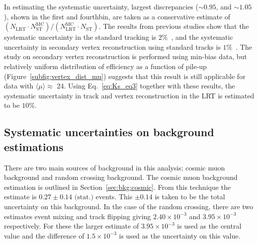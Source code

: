 In estimating the systematic uncertainty, largest discrepancies ($\sim0.95$, and $\sim1.05$), shown in the first and fourthbin, are taken as a conservative estimate of $(N_{\mathrm{LRT}} \cdot N_{\mathrm{ST}}^{\mathrm{MC}}) / (N_{\mathrm{LRT}}^{\mathrm{MC}} \cdot N_{\mathrm{ST}})$. The results from previous studies show that the systematic uncertainty in the standard tracking is $2\%$~\cite{ATL-PHYS-PUB-2015-051}, and the systematic uncertainty in secondary vertex reconstruction using standard tracks is $1\%$~\cite{Aaboud:2215485}. The study on secondary vertex reconstruction is performed using min-bias data, but relatively uniform distribution of efficiency as a function of pile-up (Figure~\ref{subfig:vertex_dist_mu}) suggests that this result is still applicable for data with $\langle \mu \rangle\approx$ 24. Using Eq.~\ref{eq:Ks_eq3} together with these results, the systematic uncertainty in track and vertex reconstruction in the LRT is estimated to be $10\%$.


%
%
%

\subsection{Systematic uncertainties on background estimations}
\label{sec:syst_bkg}

There are two main sources of background in this analysis; cosmic muon background and random crossing background. The cosmic muon background estimation is outlined in Section~\ref{sec:bkg:cosmic}. From this technique the estimate is $0.27 \pm 0.14 \textrm{ (stat.)}$ events. This $\pm 0.14$ is taken to be the total uncertainty on this background. In the case of the random crossing, there are two estimates event mixing and track flipping giving $2.40\times10^{-3}$ and $3.95 \times 10^{-3}$ respectively. For these the larger estimate of $3.95 \times 10^{-3}$ is used as the central value and the difference of $1.5\times10^{-3}$ is used as the uncertainty on this value.










